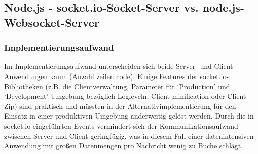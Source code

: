 \subsection{Node.js - socket.io-Socket-Server vs. node.js-Websocket-Server}\label{socket.io- vs html5-Server}
\subsubsection{Implementierungsaufwand}
Im Implementierungsaufwand unterscheiden sich beide Server- und Client-Anwendungen kaum (Anzahl zeilen code).  Einige Features der socket.io-Bibliotheken (z.B. die Clientverwaltung, Parameter für ‘Production’ und ‘Development’-Umgebung bezüglich Logleveln, Client-minification oder Client-Zip) sind praktisch und müssten in der Alternativimplementierung für den Einsatz in einer produktiven Umgebung anderweitig gelöst werden. Durch die in socket.io eingeführten Events vermindert sich der Kommunikationsaufwand zwischen Server und Client geringfügig, was in diesem Fall einer datenintensiven Anwendung mit großen Datenmengen pro Nachricht wenig zu Buche schlägt.
